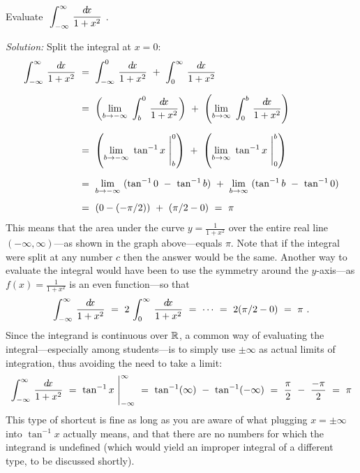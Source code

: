 \begin{exmp}\label{exmp:improper5}
\noindent Evaluate $~\displaystyle\int_{-\infty}^{\infty}\,\frac{d\!x}{1 + x^2}~$.\vspace{1mm}
\par\noindent\emph{Solution:} Split the integral at $x=0$:
\begin{align*}
\int_{-\infty}^{\infty}\,\frac{d\!x}{1 + x^2} ~&=~ \int_{-\infty}^{0}\,\frac{d\!x}{1 + x^2}
 ~+~ \int_{0}^{\infty}\,\frac{d\!x}{1 + x^2}\\[6pt]
&=~ \left(\lim_{b \to -\infty}~\int_{b}^{0}\,\frac{d\!x}{1 + x^2}\right) ~+~
    \left(\lim_{b \to \infty}~\int_{0}^{b}\,\frac{d\!x}{1 + x^2}\right)\\[6pt]
&=~ \left(\lim_{b \to -\infty}~\tan^{-1} x~\Biggr|_b^{0}\right) ~+~
    \left(\lim_{b \to \infty}~\tan^{-1} x~\Biggr|_0^{b}\right)\\[6pt]
&=~ \lim_{b \to -\infty}~ (\tan^{-1} 0 ~-~ \tan^{-1} b) ~+~
    \lim_{b \to \infty}~ (\tan^{-1} b ~-~ \tan^{-1} 0)\\[4pt]
&=~ (0 - (-\pi/2)) ~+~ (\pi/2 - 0) ~=~ \pi
\end{align*}\vspace{-14mm}
\noindent This means that the area under the curve $y=\frac{1}{1+x^2}$ over the
entire real line $(-\infty,\infty)$---as shown in the graph above---equals
$\pi$. Note that if the integral were split at any number $c$ then the answer
would be the same. Another way to evaluate the integral would have been to use
the symmetry around the $y$-axis---as $f(x)=\frac{1}{1+x^2}$ is an even
function---so that
\[
\int_{-\infty}^{\infty}\,\frac{d\!x}{1 + x^2} ~=~ 2\,\int_{0}^{\infty}\,\frac{d\!x}{1 + x^2}
~=~ \cdots ~=~ 2 (\pi/2 - 0) ~=~ \pi ~.
\]
Since the integrand is continuous over $\mathbb{R}$, a common way of evaluating the
integral---especially among students---is to simply use $\pm\infty$ as actual
limits of integration, thus avoiding the need to take a limit:
\[
\int_{-\infty}^{\infty}\,\frac{d\!x}{1 + x^2} ~=~ \tan^{-1} x~\Biggr|_{-\infty}^{\infty}
~=~ \tan^{-1} (\infty) ~-~ \tan^{-1} (-\infty) ~=~ \frac{\pi}{2} ~-~ \frac{-\pi}{2}
~=~ \pi
\]
This type of shortcut is fine as long as you are aware of what plugging
$x=\pm\infty$ into $\tan^{-1} x$ actually means, and that there are no numbers
for which the integrand is undefined (which would yield an improper integral of
a different type, to be discussed shortly).
\end{exmp}\vspace{-2mm}
